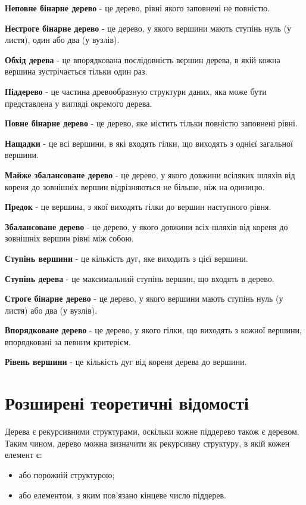 \textbf{Неповне бінарне дерево} - це дерево, рівні якого заповнені не повністю.

\textbf{Нестроге бінарне дерево} - це дерево, у якого вершини мають ступінь нуль (у листя), один або два (у вузлів).

\textbf{Обхід дерева} - це впорядкована послідовність вершин дерева, в якій кожна вершина зустрічається тільки один раз.

\textbf{Піддерево} - це частина древообразную структури даних, яка може бути представлена ​​у вигляді окремого дерева.

\textbf{Повне бінарне дерево} - це дерево, яке містить тільки повністю заповнені рівні.

\textbf{Нащадки} - це всі вершини, в які входять гілки, що виходять з однієї загальної вершини.

\textbf{Майже збалансоване дерево} - це дерево, у якого довжини всіляких шляхів від кореня до зовнішніх вершин відрізняються не більше, ніж на одиницю.

\textbf{Предок} - це вершина, з якої виходять гілки до вершин наступного рівня.

\textbf{Збалансоване дерево }- це дерево, у якого довжини всіх шляхів від кореня до зовнішніх вершин рівні між собою.

\textbf{Ступінь вершини} - це кількість дуг, яке виходить з цієї вершини.

\textbf{Ступінь дерева} - це максимальний ступінь вершин, що входять в дерево.

\textbf{Строге бінарне дерево} - це дерево, у якого вершини мають ступінь нуль (у листя) або два (у вузлів).

\textbf{Впорядковане дерево} - це дерево, у якого гілки, що виходять з кожної вершини, впорядковані за певним критерієм.

\textbf{Рівень вершини} - це кількість дуг від кореня дерева до вершини.

\section{Розширені теоретичні відомості}
\nopagebreak[4]

Дерева є рекурсивними структурами, оскільки кожне піддерево також є деревом. Таким чином, дерево можна визначити як рекурсивну структуру, в якій кожен елемент є:

\begin{itemize}
\item або порожній структурою;
\item або елементом, з яким пов'язано кінцеве число піддерев.
\end{itemize}


